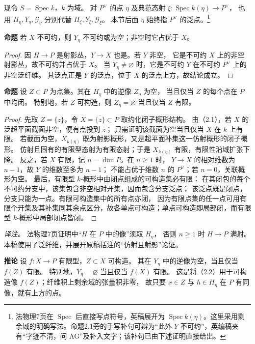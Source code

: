 \documentclass[openany,fontset=fandol]{ctexbook}
\newcommand{\GG}{\mathcal G}
\newcommand{\Spec}{\operatorname{Spec}}
\newcommand{\tagitem}[2]{\par\medskip\noindent\textbf{#1\quad #2}\enspace}
\begin{document}
现令 \(S=\Spec k\)，\(k\) 为域。
对 \(P^\vee\) 的点 \(\eta\) 及典范态射 \(\xi:\Spec k(\eta)\to P^\vee\)，
也用 \(H_\eta,Y_\eta,\GG_\eta\) 分别代替 \(H_\xi,Y_\xi,\GG_\xi\)。
本节后面 \(\eta\) 始终指 \(P^\vee\) 的泛点。\footnote{法物理7页在 \(\Spec\) 后直接写点符号，英稿展开为 \(\Spec k(\eta)\)。这里采用剩余域的明确写法。命题2.1旁的手写补句可辨为“此外 \(Y\) 不可约”，英编稿夹有“字迹不清，问 AG”及补入文字；该补句已由下述证明直接给出。}

\tagitem{命题}{2.1}
若 \(X\) 不可约，则 \(Y_\eta\) 不可约或为空；非空时它占优于 \(X\)。
\begin{proof}
因 \(H\to P\) 是射影丛，\(Y\to X\) 也是。若 \(Y\) 非空，
它是不可约 \(X\) 上的非空射影丛，故不可约并占优于 \(X\)。
当 \(Y_\eta\ne\varnothing\) 时，它是不可约 \(Y\) 在不可约 \(P^\vee\) 上的非空泛纤维。
其泛点正是 \(Y\) 的泛点，位于 \(X\) 的泛点上方，故结论成立。
\end{proof}

\tagitem{命题}{2.2}
设 \(Z\subset P\) 为点集。其在 \(H_\eta\) 中的逆像 \(Z_\eta\) 为空，
当且仅当 \(Z\) 的每个点在 \(P\) 中均闭。
特别地，若 \(Z\) 可构造，则 \(Z_\eta=\varnothing\) 当且仅当 \(Z\) 有限。
\begin{proof}
先取 \(Z=\{z\}\)，令 \(X=\overline{\{z\}}\subset P\) 取约化闭子概形结构。
由（2.1），若 \(X\) 的泛超平面截面非空，便有点投到 \(z\)；
只需证明该截面为空当且仅当 \(X\) 在 \(k\) 上有限。
若截面为空，\(X_{k(\eta)}\) 既为射影概形，又是超平面补集这一仿射概形的闭子概形。
仿射且固有的有限型态射为有限态射；于是 \(X_{k(\eta)}\) 有限，有限性沿域扩张下降。
反之，若 \(X\) 有限，记 \(n=\dim P\)。在 \(n\ge1\) 时，
\(Y\to X\) 的相对维数为 \(n-1\)，故 \(Y\) 的维数至多为 \(n-1\)；
不能占优于维数 \(n\) 的 \(P^\vee\)；若 \(n=0\)，关联概形为空。
最后，有限型 \(k\)-概形中由闭点组成的可构造集必有限：
在其闭包的每个不可约分支中，该集包含非空相对开集，因而包含分支泛点；
该泛点既是闭点，分支只能为一点。有限可构造集中的所有点亦闭，
因为有限点集的任一点可用有限个开集及其补集同其余点区分，故各单点可构造；单点可构造即局部闭，而有限型 \(k\)-概形中局部闭点皆闭。
\end{proof}
\noindent\emph{译注。} 法物理7页证明中“\(H\) 在 \(P\) 中的像”须取 \(H_\eta\)，
否则 \(n\ge1\) 时 \(H\to P\) 满射。本稿使用了泛纤维，并展开原稿括注的“仿射且射影”论证。

\tagitem{推论}{2.3}
设 \(f:X\to P\) 有限型，\(Z\subset X\) 可构造。
其在 \(Y_\eta\) 中的逆像为空，当且仅当 \(f(Z)\) 有限。
特别地，\(Y_\eta=\varnothing\) 当且仅当 \(f(X)\) 有限。
这是将（2.2）用于可构造像 \(f(Z)\)；纤维积上剩余域的张量积非零，
故只要 \(x\in Z\) 与 \(h\in H_\eta\) 在 \(P\) 有同像，就有上方的点。
\end{document}
